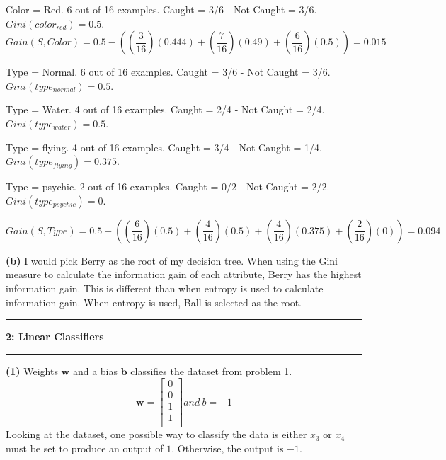 \documentclass[11pt]{article}
\newcommand\question[2]{\vspace{.25in}\hrule\textbf{#1: #2}\vspace{.5em}\hrule\vspace{.10in}}
\renewcommand\part[1]{\vspace{.10in}\textbf{(#1)}}
\begin{document}
Color = Red. 6 out of 16 examples. Caught = 3/6 - Not Caught = 3/6. $Gini(color_{red}) = 0.5$.
$$Gain(S, Color) = 0.5 - ((\frac{3}{16})(0.444) + (\frac{7}{16})(0.49) + (\frac{6}{16})(0.5)) = 0.015$$

 \par 

Type = Normal. 6 out of 16 examples. Caught = 3/6 - Not Caught = 3/6. $Gini(type_{normal}) = 0.5$.

Type = Water. 4 out of 16 examples. Caught = 2/4 - Not Caught = 2/4. $Gini(type_{water}) = 0.5$.

Type = flying. 4 out of 16 examples. Caught = 3/4 - Not Caught = 1/4. $Gini(type_{flying}) = 0.375$.

Type = psychic. 2 out of 16 examples. Caught = 0/2 - Not Caught = 2/2. $Gini(type_{psychic}) = 0$.

$$Gain(S, Type) = 0.5 - ((\frac{6}{16})(0.5) + (\frac{4}{16})(0.5) + (\frac{4}{16})(0.375) + (\frac{2}{16})(0)) = 0.094$$

 \par 



\qquad \part{b} I would pick Berry as the root of my decision tree. When using the Gini measure to calculate the information gain of each attribute, Berry has the highest information gain. This is different than when entropy is used to calculate information gain. When entropy is used, Ball is selected as the root.

\newpage
\question{2}{Linear Classifiers}

\part{1} Weights $\mathbf{w}$ and a bias $\mathbf{b}$ classifies the dataset from problem 1.
$$
\mathbf{w} = \begin{bmatrix}
0 \\
0 \\
1 \\
1 \\ 	
\end{bmatrix}
 and \ b = -1
$$
Looking at the dataset, one possible way to classify the data is either $x_3$ or $x_4$ must be set to produce an output of $1$. Otherwise, the output is $-1$.
\end{document}
